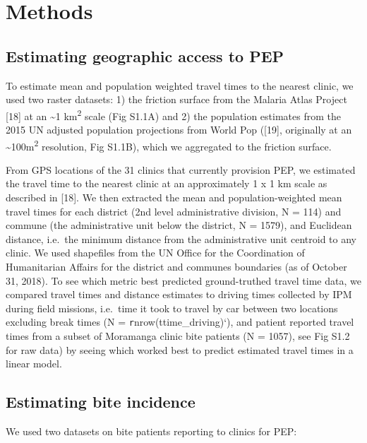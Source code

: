 \documentclass[
  oneside]{book}
\begin{document}
\hypertarget{methods-1}{%
\section{Methods}\label{methods-1}}

\hypertarget{estimating-geographic-access-to-pep}{%
\subsection{Estimating geographic access to PEP}\label{estimating-geographic-access-to-pep}}

To estimate mean and population weighted travel times to the nearest
clinic, we used two raster datasets: 1) the friction surface from the
Malaria Atlas Project {[}18{]} at an \textasciitilde1 km\textsuperscript{2} scale (Fig S1.1A) and 2)
the population estimates from the 2015 UN adjusted population
projections from World Pop ({[}19{]}, originally at an \textasciitilde100m\textsuperscript{2}
resolution, Fig S1.1B), which we aggregated to the friction surface.

From GPS locations of the 31 clinics that currently provision PEP, we
estimated the travel time to the nearest clinic at an approximately 1 x
1 km scale as described in {[}18{]}. We then extracted the mean and
population-weighted mean travel times for each district (2nd level
administrative division, N = 114) and commune (the administrative unit
below the district, N = 1579), and Euclidean distance, i.e.~the minimum
distance from the administrative unit centroid to any clinic. We used
shapefiles from the UN Office for the Coordination of Humanitarian
Affairs for the district and communes boundaries (as of October 31,
2018). To see which metric best predicted ground-truthed travel time
data, we compared travel times and distance estimates to driving times
collected by IPM during field missions, i.e.~time it took to travel by
car between two locations excluding break times (N =
\texttt{r}nrow(ttime\_driving)`), and patient reported travel times from a
subset of Moramanga clinic bite patients (N = 1057), see Fig S1.2 for
raw data) by seeing which worked best to predict estimated travel times
in a linear model.

\hypertarget{estimating-bite-incidence}{%
\subsection{Estimating bite incidence}\label{estimating-bite-incidence}}

We used two datasets on bite patients reporting to clinics for PEP:
\end{document}
